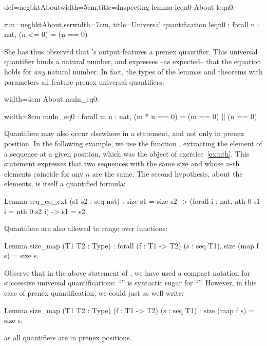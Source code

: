 \begin{coq}{def=negbktAbout}{width=5cm,title=Inspecting lemma leqn0}
About leqn0.
\end{coq}
\begin{coqout}{run=negbktAbout,ssr}{width=7cm, title=Universal quantification}
leqn0 : forall n : nat, (n <= 0) = (n == 0)
\end{coqout}

She has thus observed that \Coq{}'s output features a prenex
 quantifier. This universal quantifier binds a natural number, and
expresses --as expected-- that the equation holds for \emph{any}
natural number. In fact, the types of the lemmas and theorems with
parameters all feature prenex universal quantifiers:

\begin{coq}{}{width=4cm}
About muln_eq0.
$~$
\end{coq}
\begin{coqout}{}{width=8cm}
muln_eq0 : forall m n : nat,
  (m * n == 0) = (m == 0) || (n == 0)
\end{coqout}
Quantifiers may also occur elsewhere in a statement, and not only in
prenex position.  In the following example, we use the function
, extracting the element of a sequence at a given position, which was
the object of exercise~\ref{ex:nth}. This statement expresses that two
sequences with the same size and whose $n$-th elements coincide for any
$n$ are the same. The second hypothesis, about the elements, is
itself a quantified formula:

\begin{coq}{}{}
Lemma seq_eq_ext (s1 s2 : seq nat) :
  size s1 = size s2 ->
  (forall i : nat, nth 0 s1 i = nth 0 s2 i) ->
  s1 = s2.
\end{coq}
Quantifiers are also allowed to range over functions:

\begin{coq}{}{}
Lemma size_map (T1 T2 : Type) :
  forall (f : T1 -> T2) (s : seq T1), size (map f s) = size s.
\end{coq}
Observe that in the above statement of , we have used a
compact notation for successive universal quantifications:
``'' is syntactic sugar for
``''. However, in this case
of prenex quantification, we could just as well write:

\begin{coq}{}{}
Lemma size_map (T1 T2 : Type) (f : T1 -> T2) (s : seq T1) :
  size (map f s) = size s.
\end{coq}
as all quantifiers are in prenex positions.

